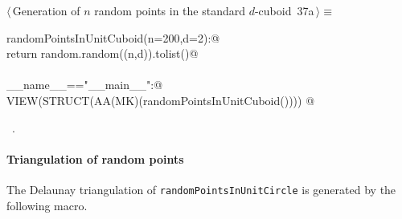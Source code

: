 \documentclass[11pt,oneside]{article}	%
\begin{document}
\begin{flushleft} \small \label{scrap47}
\protect{}$\langle\,$Generation of $n$ random points in the standard $d$-cuboid\nobreak\ {\footnotesize 37a}$\,\rangle\equiv$
\vspace{-1ex}
\begin{list}{}{} \item
\mbox{}\verb@def randomPointsInUnitCuboid(n=200,d=2):@\\
\mbox{}\verb@   return random.random((n,d)).tolist()@\\
\mbox{}\verb@@\\
\mbox{}\verb@if __name__=="__main__":@\\
\mbox{}\verb@   VIEW(STRUCT(AA(MK)(randomPointsInUnitCuboid()))) @\\
\mbox{}\verb@@{\NWsep}
\end{list}
\vspace{-1ex}
\footnotesize\addtolength{\baselineskip}{-1ex}
\begin{list}{}{\setlength{\itemsep}{-\parsep}\setlength{\itemindent}{-\leftmargin}}
\item \NWtxtMacroRefIn\ .
\end{list}
\end{flushleft}



\paragraph{Triangulation of random points} The Delaunay triangulation of \texttt{randomPointsInUnitCircle} is generated by the following macro.
\end{document}
